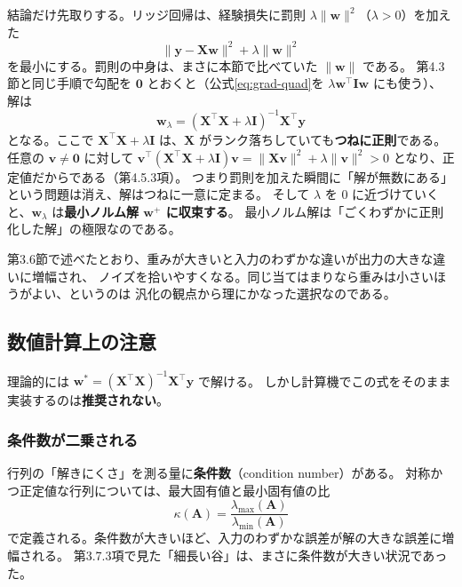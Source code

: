 結論だけ先取りする。リッジ回帰は、経験損失に罰則 $\lambda\|\bm{w}\|^2$（$\lambda > 0$）を加えた
\begin{equation*}
  \|\bm{y} - \bm{X}\bm{w}\|^2 + \lambda\|\bm{w}\|^2
\end{equation*}
を最小にする。罰則の中身は、まさに本節で比べていた $\|\bm{w}\|$ である。
第4.3節と同じ手順で勾配を $\bm{0}$ とおくと（公式\eqref{eq:grad-quad}を $\lambda\bm{w}^\top\bm{I}\bm{w}$ にも使う）、
解は
\begin{equation*}
  \bm{w}_\lambda = (\bm{X}^\top\bm{X} + \lambda\bm{I})^{-1}\bm{X}^\top\bm{y}
\end{equation*}
となる。ここで $\bm{X}^\top\bm{X} + \lambda\bm{I}$ は、$\bm{X}$ がランク落ちしていても\textbf{つねに正則}である。
任意の $\bm{v} \neq \bm{0}$ に対して
$\bm{v}^\top(\bm{X}^\top\bm{X} + \lambda\bm{I})\bm{v} = \|\bm{X}\bm{v}\|^2 + \lambda\|\bm{v}\|^2 > 0$
となり、正定値だからである（第4.5.3項）。
つまり罰則を加えた瞬間に「解が無数にある」という問題は消え、解はつねに一意に定まる。
そして $\lambda$ を $0$ に近づけていくと、$\bm{w}_\lambda$ は\textbf{最小ノルム解 $\bm{w}^{+}$ に収束する}。
最小ノルム解は「ごくわずかに正則化した解」の極限なのである。

第3.6節で述べたとおり、重みが大きいと入力のわずかな違いが出力の大きな違いに増幅され、
ノイズを拾いやすくなる。同じ当てはまりなら重みは小さいほうがよい、というのは
汎化の観点から理にかなった選択なのである。


\subsection{数値計算上の注意}

理論的には $\bm{w}^* = (\bm{X}^\top\bm{X})^{-1}\bm{X}^\top\bm{y}$ で解ける。
しかし計算機でこの式をそのまま実装するのは\textbf{推奨されない}。

\subsubsection{条件数が二乗される}

行列の「解きにくさ」を測る量に\textbf{条件数}（condition number）がある。
対称かつ正定値な行列については、最大固有値と最小固有値の比
\begin{equation}
  \kappa(\bm{A}) = \frac{\lambda_{\max}(\bm{A})}{\lambda_{\min}(\bm{A})}
\end{equation}
で定義される。条件数が大きいほど、入力のわずかな誤差が解の大きな誤差に増幅される。
第3.7.3項で見た「細長い谷」は、まさに条件数が大きい状況であった。

